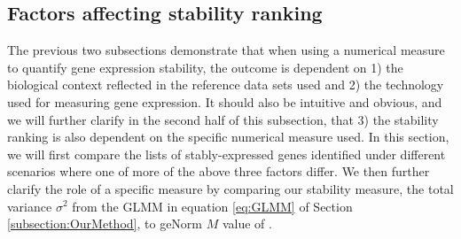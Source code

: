 \documentclass[11pt, a4paper]{article}
\begin{document}
\subsection{Factors affecting stability ranking}\label{section:stabilityMeasure}
The previous two subsections demonstrate that when using a numerical measure
to quantify gene expression stability, the outcome is dependent on 1) the
biological context reflected in the reference data sets used and 2) the
technology used for measuring gene expression. It should also be intuitive and
obvious, and we will further clarify in the second half of this subsection,
that 3) the stability ranking is also dependent on the specific numerical
measure used.  In this section, we will first compare the lists of
stably-expressed genes identified under different scenarios where one of more
of the above three factors differ.  We then further clarify the role of a
specific measure by comparing our stability measure, the total variance
$\sigma^2$ from the GLMM in equation \ref{eq:GLMM} of Section
\ref{subsection:OurMethod}, to geNorm $M$ value of
\cite{vandesompele2002accurate}. 
\end{document}
